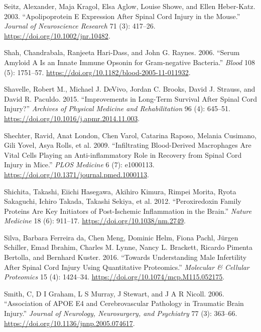 \documentclass[9pt,lineno]{elife}
\newlength{\cslhangindent}
\newlength{\cslentryspacingunit} %
\newenvironment{CSLReferences}[2] %
 {%
  \setlength{\parindent}{0pt}
  \ifodd #1
  \let\oldpar\par
  \def\par{\hangindent=\cslhangindent\oldpar}
  \fi
  \setlength{\parskip}{#2\cslentryspacingunit}
 }%
 {}
\begin{document}
\begin{CSLReferences}{1}{0}
\leavevmode{}%
Seitz, Alexander, Maja Kragol, Elsa Aglow, Louise Showe, and Ellen Heber-Katz. 2003. {``Apolipoprotein {E} Expression After Spinal Cord Injury in the Mouse.''} \emph{Journal of Neuroscience Research} 71 (3): 417--26. \url{https://doi.org/10.1002/jnr.10482}.

\leavevmode{}%
Shah, Chandrabala, Ranjeeta Hari-Dass, and John G. Raynes. 2006. {``Serum Amyloid {A} Is an Innate Immune Opsonin for {Gram-negative} Bacteria.''} \emph{Blood} 108 (5): 1751--57. \url{https://doi.org/10.1182/blood-2005-11-011932}.

\leavevmode{}%
Shavelle, Robert M., Michael J. DeVivo, Jordan C. Brooks, David J. Strauss, and David R. Paculdo. 2015. {``Improvements in {Long-Term Survival After Spinal Cord Injury}?''} \emph{Archives of Physical Medicine and Rehabilitation} 96 (4): 645--51. \url{https://doi.org/10.1016/j.apmr.2014.11.003}.

\leavevmode{}%
Shechter, Ravid, Anat London, Chen Varol, Catarina Raposo, Melania Cusimano, Gili Yovel, Asya Rolls, et al. 2009. {``Infiltrating {Blood-Derived Macrophages Are Vital Cells Playing} an {Anti-inflammatory Role} in {Recovery} from {Spinal Cord Injury} in {Mice}.''} \emph{PLOS Medicine} 6 (7): e1000113. \url{https://doi.org/10.1371/journal.pmed.1000113}.

\leavevmode{}%
Shichita, Takashi, Eiichi Hasegawa, Akihiro Kimura, Rimpei Morita, Ryota Sakaguchi, Ichiro Takada, Takashi Sekiya, et al. 2012. {``Peroxiredoxin Family Proteins Are Key Initiators of Post-Ischemic Inflammation in the Brain.''} \emph{Nature Medicine} 18 (6): 911--17. \url{https://doi.org/10.1038/nm.2749}.

\leavevmode{}%
Silva, Barbara Ferreira da, Chen Meng, Dominic Helm, Fiona Pachl, Jürgen Schiller, Emad Ibrahim, Charles M. Lynne, Nancy L. Brackett, Ricardo Pimenta Bertolla, and Bernhard Kuster. 2016. {``Towards {Understanding Male Infertility After Spinal Cord Injury Using Quantitative Proteomics}.''} \emph{Molecular \& Cellular Proteomics} 15 (4): 1424--34. \url{https://doi.org/10.1074/mcp.M115.052175}.

\leavevmode{}%
Smith, C, D I Graham, L S Murray, J Stewart, and J A R Nicoll. 2006. {``Association of {APOE} E4 and Cerebrovascular Pathology in Traumatic Brain Injury.''} \emph{Journal of Neurology, Neurosurgery, and Psychiatry} 77 (3): 363--66. \url{https://doi.org/10.1136/jnnp.2005.074617}.


\end{CSLReferences}
\end{document}
